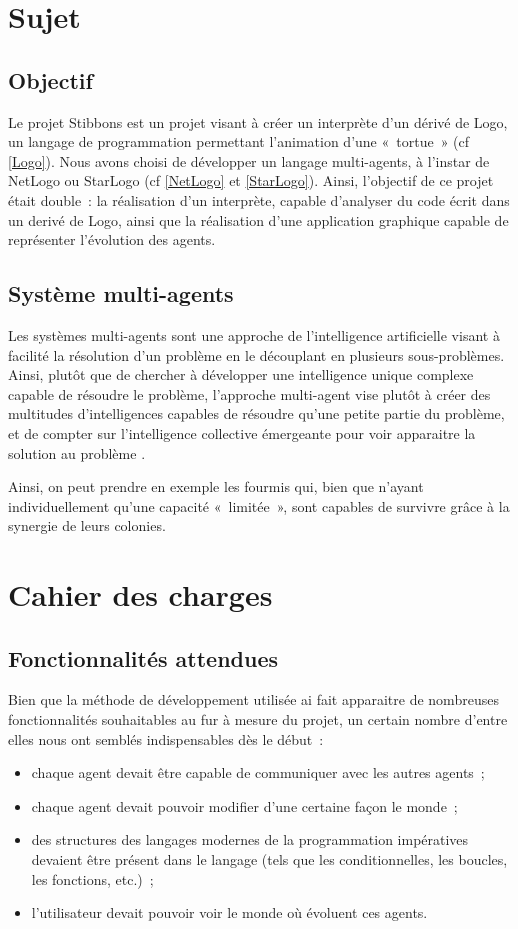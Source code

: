 \section{Sujet}
	\subsection{Objectif}
	Le projet Stibbons est un projet visant à créer un interprète d'un dérivé de Logo, un langage de programmation permettant l'animation d'une «~tortue~» (cf \ref{Logo}). Nous avons choisi de développer un langage multi-agents, à l'instar de NetLogo ou StarLogo (cf \ref{NetLogo} et \ref{StarLogo}). Ainsi, l'objectif de ce projet était double~: la réalisation d'un interprète, capable d'analyser du code écrit dans un derivé de Logo, ainsi que la réalisation d'une application graphique capable de représenter l'évolution des agents.
	
	\subsection{Système multi-agents}
	Les systèmes multi-agents sont une approche de l'intelligence artificielle visant à facilité la résolution d'un problème en le découplant en plusieurs sous-problèmes. Ainsi, plutôt que de chercher à développer une intelligence unique complexe capable de résoudre le problème, l'approche multi-agent vise plutôt à créer des multitudes d'intelligences capables de résoudre qu'une petite partie du problème, et de compter sur l'intelligence collective émergeante pour voir apparaitre la solution au problème \cite{sma}.

	Ainsi, on peut prendre en exemple les fourmis qui, bien que n'ayant individuellement qu'une capacité «~limitée~», sont capables de survivre grâce à la synergie de leurs colonies.

\section{Cahier des charges}
	\subsection{Fonctionnalités attendues}
	Bien que la méthode de développement utilisée ai fait apparaitre de nombreuses fonctionnalités souhaitables au fur à mesure du projet, un certain nombre d'entre elles nous ont semblés indispensables dès le début~:
	\begin{itemize}
		\item chaque agent devait être capable de communiquer avec les autres agents~;
		\item chaque agent devait pouvoir modifier d'une certaine façon le monde~;
		\item des structures des langages modernes de la programmation impératives devaient être présent dans le langage (tels que les conditionnelles, les boucles, les fonctions, etc.)~;
		\item l'utilisateur devait pouvoir voir le monde où évoluent ces agents.
	\end{itemize}

